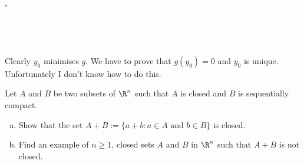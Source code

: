 \documentclass[a4paper]{article}
\begin{document}
\hfill $\square$

\subsection{~} %

Clearly $y_0$ minimises $g$. We have to prove that $g(y_0) = 0$ and $y_0$ is unique. Unfortunately I don't know how to do this.







\begin{questionbody}
Let $A$ and $B$ be two subsets of $\R^n$ such that $A$ is closed and $B$ is sequentially compact.
\begin{enumerate}[(a)]
\item Show that the set ${A + B} := \{ a + b : a \in A \text{ and } b \in B \}$ is closed.

\item Find an example of $n \ge 1$, closed sets $A$ and $B$ in $\R^n$ such that ${A + B}$ is not closed.
\end{enumerate}
\end{questionbody}

\subsection{~} %
\end{document}
